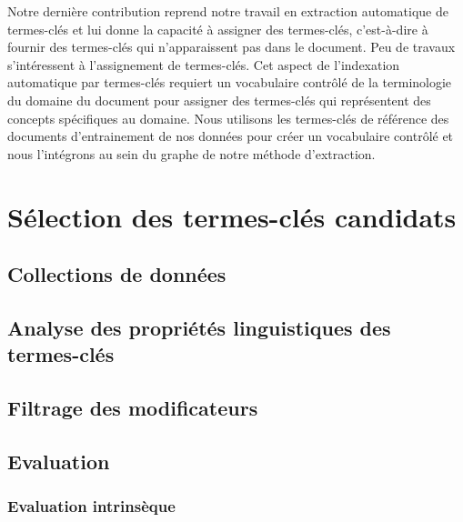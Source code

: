     Notre dernière contribution reprend notre travail en extraction
    automatique de termes-clés et lui donne la capacité à assigner des
    termes-clés, c'est-à-dire à fournir des termes-clés qui n'apparaissent pas
    dans le document. Peu de travaux s'intéressent à l'assignement de
    termes-clés. Cet aspect de l'indexation automatique par termes-clés requiert
    un vocabulaire contrôlé de la terminologie du domaine du document pour
    assigner des termes-clés qui représentent des concepts spécifiques au
    domaine. Nous utilisons les termes-clés de référence des documents
    d'entrainement de nos données pour créer un vocabulaire contrôlé et nous
    l'intégrons au sein du graphe de notre méthode d'extraction.


  \section{Sélection des termes-clés candidats}
  \label{sec:main-automatic_keyphrase_annotation-keyphrase_candidate_selection}

    \subsection{Collections de données}
    \label{subsec:main-automatic_keyphrase_annotation-keyphrase_candidate_selection-datasets}
    \subsection{Analyse des propriétés linguistiques des termes-clés}
    \label{subsec:main-automatic_keyphrase_annotation-keyphrase_candidate_selection-analysis_of_keyphrase_properties}

    \subsection{Filtrage des modificateurs}
    \label{subsec:main-automatic_keyphrase_annotation-keyphrase_candidate_selection-modifiers_filtering}

    \subsection{Evaluation}
    \label{subsec:main-automatic_keyphrase_annotation-keyphrase_candidate_selection-evaluation}
      \subsubsection{Evaluation intrinsèque}
      \label{subsubsec:main-automatic_keyphrase_annotation-keyphrase_candidate_selection-evaluation-intrinsic_evaluation}

